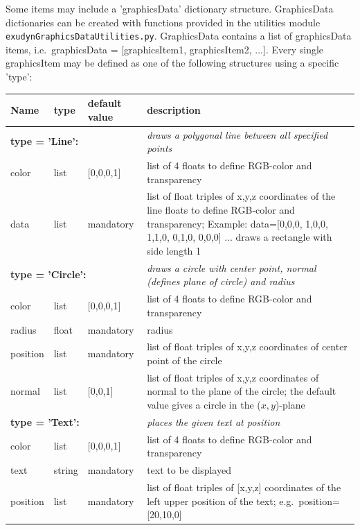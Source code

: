 \documentclass[11pt,a4paper]{book} %
\begin{document}
Some items may include a 'graphicsData' dictionary structure. 
GraphicsData dictionaries can be created with functions provided in the utilities module \texttt{exudynGraphicsDataUtilities.py}.
GraphicsData contains a list of graphicsData items, i.e.\ graphicsData = [graphicsItem1, graphicsItem2, ...]. Every single graphicsItem may be defined as one of the following structures using a specific 'type':
\begin{center}
  \footnotesize
  \begin{longtable}{| p{3cm} | p{2cm} | p{3cm} | p{7.5cm} |} 
	\hline
  \bf Name & \bf type & \bf default value & \bf description \\ \hline
%
	\multicolumn{3}{l}{\parbox{8cm}{\bf type = 'Line': }} & \multicolumn{1}{l}{\parbox{7.5cm}{\it draws a polygonal line between all specified points}}\\ \hline
  color & list & [0,0,0,1] & list of 4 floats to define RGB-color and transparency\\ \hline
  data & list &  mandatory & list of float triples of x,y,z coordinates of the line floats to define RGB-color and transparency; Example: data=[0,0,0, 1,0,0, 1,1,0, 0,1,0, 0,0,0] ... draws a rectangle with side length 1\\ \hline
%
	\multicolumn{3}{l}{\parbox{8cm}{\bf type = 'Circle': }} & \multicolumn{1}{l}{\parbox{7.5cm}{\it draws a circle with center point, normal (defines plane of circle) and radius}}\\ \hline
  color & list & [0,0,0,1] & list of 4 floats to define RGB-color and transparency\\ \hline
  radius & float & mandatory & radius\\ \hline
  position & list & mandatory & list of float triples of x,y,z coordinates of center point of the circle\\ \hline
  normal & list & [0,0,1] & list of float triples of x,y,z coordinates of normal to the plane of the circle; the default value gives a circle in the ($x,y$)-plane\\ \hline
	\multicolumn{3}{l}{\parbox{8cm}{\bf type = 'Text': }} & \multicolumn{1}{l}{\parbox{7.5cm}{\it places the given text at position}}\\ \hline
  color & list & [0,0,0,1] & list of 4 floats to define RGB-color and transparency\\ \hline
  text & string & mandatory & text to be displayed\\ \hline
  position & list & mandatory & list of float triples of [x,y,z] coordinates of the left upper position of the text; e.g.\ position=[20,10,0] \\ \hline

\end{longtable}
\end{center}
\end{document}
